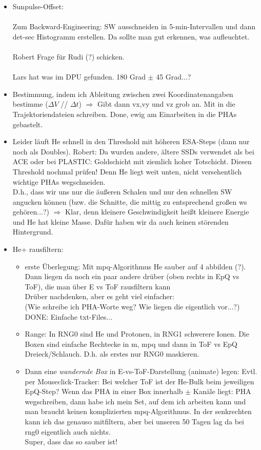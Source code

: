 \documentclass[11pt,letterpaper]{article}
\begin{document}
\begin{itemize}
	\item Sunpulse-Offset: \\ \\Zum Backward-Engineering: SW ausschneiden in 5-min-Intervallen und dann det-sec Histogramm erstellen. Da sollte man gut erkennen, was aufleuchtet.\\ \\ Robert Frage für Rudi (?) schicken.\\ \\
	Lars hat was im DPU gefunden.  180 Grad $\pm$ 45 Grad...?
	\item {} Bestimmung, indem ich Ableitung zwischen zwei Koordinatenangaben bestimme ($\Delta V$ // $\Delta t$) $\Rightarrow$ Gibt dann vx,vy und vz grob an. Mit in die Trajektoriendateien schreiben. Done, ewig am Einarbeiten in die PHAs gebastelt.
	\item Leider läuft He schnell in den Threshold mit höheren ESA-Steps (dann nur noch als Doubles). Robert: Da wurden andere, ältere SSDs verwendet als bei ACE oder bei PLASTIC: Goldschicht mit ziemlich hoher Totschicht.  Diesen Threshold nochmal prüfen! Denn He liegt weit unten, nicht versehentlich wichtige PHAs wegschneiden. \\	 
	D.h., dass wir uns nur die äußeren Schalen und nur den schnellen SW angucken können (bzw. die Schnitte, die mittig zu entsprechend großen ws gehören...?) $\Rightarrow$ Klar, denn kleinere Geschwindigkeit heißt kleinere Energie und He hat kleine Masse.  Dafür haben wir da auch keinen störenden Hintergrund.
	\item He+ rausfiltern:
	\begin{itemize}
		\item erste Überlegung: Mit mpq-Algorithmus He sauber auf 4 abbilden (?). Dann liegen da noch ein paar andere drüber (oben rechts in EpQ vs ToF), die man über E vs ToF rausfiltern kann\\
		Drüber nachdenken, aber es geht viel einfacher:
		\\  (Wie schreibe ich PHA-Worte weg? Wie liegen die eigentlich vor...?) DONE: Einfache txt-Files...
		\item Range: In RNG0 sind He und Protonen, in RNG1 schwerere Ionen. Die Boxen sind einfache Rechtecke in m, mpq und dann in ToF vs EpQ Dreieck/Schlauch. D.h. als erstes nur RNG0 maskieren.
		\item Dann eine \textit{wandernde Box} in E-vs-ToF-Darstellung (animate) legen: Evtl. per Mouseclick-Tracker: Bei welcher ToF ist der He-Bulk beim jeweiligen EpQ-Step? Wenn das PHA in einer Box innerhalb $\pm$ Kanäle liegt: PHA wegschreiben, dann habe ich mein Set, auf dem ich arbeiten kann und man braucht keinen komplizierten mpq-Algorithmus. In der senkrechten kann ich das genauso mitfiltern, aber bei unseren 50 Tagen lag da bei rng0 eigentlich auch nichts. \\ Super, dass das so sauber ist!

\end{itemize}
\end{itemize}
\end{document}
